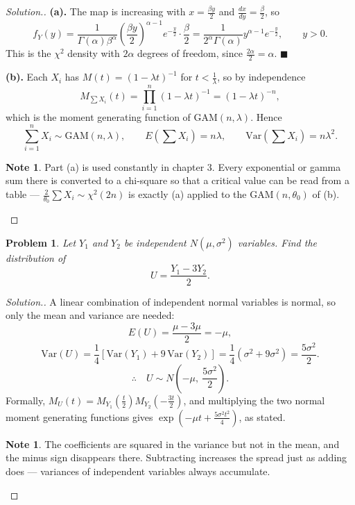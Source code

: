 \documentclass[12pt,a4paper]{report}
\theoremstyle{definition}
\newtheorem{note}[thm]{Note}
\theoremstyle{plain}
\newtheorem{problemx}{Problem}[section]
\newenvironment{problem}{\begin{problemx}}{\end{problemx}}
\newenvironment{solution}
  {\renewcommand{\qedsymbol}{}\begin{proof}[\textit{Solution}.]}
  {\end{proof}}
\begin{document}
\begin{solution}
\textbf{(a).} The map is increasing with $x=\frac{\beta y}{2}$ and
$\frac{dx}{dy}=\frac{\beta}{2}$, so
\[f_Y(y)=\frac{1}{\Gamma(\alpha)\beta^\alpha}
\left(\frac{\beta y}{2}\right)^{\alpha-1}e^{-\frac{y}{2}}\cdot\frac{\beta}{2}
=\frac{1}{2^{\alpha}\Gamma(\alpha)}y^{\alpha-1}e^{-\frac{y}{2}},\qquad y>0.\]
This is the $\chi^2$ density with $2\alpha$ degrees of freedom, since
$\frac{2\alpha}{2}=\alpha$. $\blacksquare$

\textbf{(b).} Each $X_i$ has $M(t)=(1-\lambda t)^{-1}$ for $t<\frac1\lambda$, so
by independence
\[M_{\sum X_i}(t)=\prod_{i=1}^n(1-\lambda t)^{-1}=(1-\lambda t)^{-n},\]
which is the moment generating function of $\text{GAM}(n,\lambda)$. Hence
\[\sum_{i=1}^nX_i\sim\text{GAM}(n,\lambda),\qquad
E\left(\sum X_i\right)=n\lambda,\qquad
\text{Var}\left(\sum X_i\right)=n\lambda^2.\]

\begin{note}
Part (a) is used constantly in chapter 3. Every exponential or gamma sum there is
converted to a chi-square so that a critical value can be read from a table ---
$\frac{2}{\theta_0}\sum X_i\sim\chi^2(2n)$ is exactly (a) applied to the
$\text{GAM}(n,\theta_0)$ of (b).
\end{note}
\end{solution}

\begin{problem}
Let $Y_1$ and $Y_2$ be independent $N\left(\mu,\sigma^2\right)$ variables. Find
the distribution of
\[U=\frac{Y_1-3Y_2}{2}.\]
\end{problem}

\begin{solution}
A linear combination of independent normal variables is normal, so only the mean
and variance are needed:
\[E(U)=\frac{\mu-3\mu}{2}=-\mu,\]
\[\text{Var}(U)=\frac{1}{4}\left[\text{Var}(Y_1)+9\,\text{Var}(Y_2)\right]
=\frac{1}{4}\left(\sigma^2+9\sigma^2\right)=\frac{5\sigma^2}{2}.\]
\[\therefore\quad U\sim N\!\left(-\mu,\ \frac{5\sigma^2}{2}\right).\]
Formally, $M_U(t)=M_{Y_1}\!\left(\frac{t}{2}\right)
M_{Y_2}\!\left(-\frac{3t}{2}\right)$, and multiplying the two normal moment
generating functions gives
$\exp\left(-\mu t+\frac{5\sigma^2t^2}{4}\right)$, as stated.

\begin{note}
The coefficients are squared in the variance but not in the mean, and the minus
sign disappears there. Subtracting increases the spread just as adding does ---
variances of independent variables always accumulate.
\end{note}
\end{solution}
\end{document}
